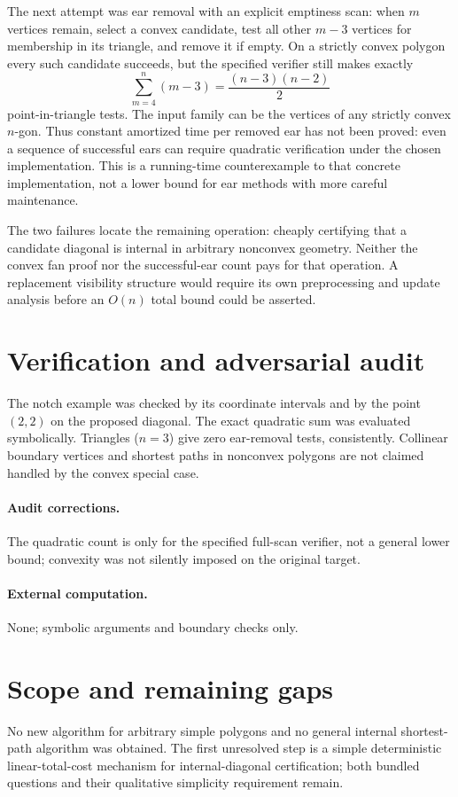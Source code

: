 \documentclass[11pt]{article}
\begin{document}
The next attempt was ear removal with an explicit emptiness scan: when $m$
vertices remain, select a convex candidate, test all other $m-3$ vertices for
membership in its triangle, and remove it if empty. On a strictly convex polygon
every such candidate succeeds, but the specified verifier still makes exactly
\[
 \sum_{m=4}^n(m-3)=\frac{(n-3)(n-2)}2
\]
point-in-triangle tests. The input family can be the vertices of any strictly
convex $n$-gon. Thus constant amortized time per removed ear has not been proved:
even a sequence of successful ears can require quadratic verification under the
chosen implementation. This is a running-time counterexample to that concrete
implementation, not a lower bound for ear methods with more careful maintenance.

The two failures locate the remaining operation: cheaply certifying that a
candidate diagonal is internal in arbitrary nonconvex geometry. Neither the
convex fan proof nor the successful-ear count pays for that operation. A
replacement visibility structure would require its own preprocessing and update
analysis before an $O(n)$ total bound could be asserted.
\section{Verification and adversarial audit}
The notch example was checked by its coordinate intervals and by the point
$(2,2)$ on the proposed diagonal. The exact quadratic sum was evaluated
symbolically. Triangles ($n=3$) give zero ear-removal tests, consistently. Collinear
boundary vertices and shortest paths in nonconvex polygons are not claimed
handled by the convex special case.
\paragraph{Audit corrections.} The quadratic count is only for the specified full-scan verifier, not a general lower bound; convexity was not silently imposed on the original target.
\paragraph{External computation.} None; symbolic arguments and boundary checks only.
\section{Scope and remaining gaps}
No new algorithm for arbitrary simple polygons and no general internal
shortest-path algorithm was obtained. The first unresolved step is a simple
deterministic linear-total-cost mechanism for internal-diagonal certification;
both bundled questions and their qualitative simplicity requirement remain.
\end{document}
